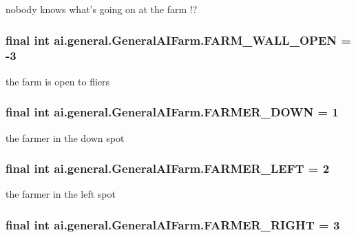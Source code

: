 \label{classai_1_1general_1_1_general_a_i_farm_aed2adecb0cce6a9a2fa0806c8fa11af5}
nobody knows what's going on at the farm !? \hypertarget{classai_1_1general_1_1_general_a_i_farm_a9235a0a0538a426043d785a00a3d4345}{
\subsubsection[{FARM\_\-WALL\_\-OPEN}]{\setlength{\rightskip}{0pt plus 5cm}final int {\bf ai.general.GeneralAIFarm.FARM\_\-WALL\_\-OPEN} = -\/3}}
\label{classai_1_1general_1_1_general_a_i_farm_a9235a0a0538a426043d785a00a3d4345}
the farm is open to fliers \hypertarget{classai_1_1general_1_1_general_a_i_farm_a8c4ee9d0755408d23fc4a2e3ce9a1dc1}{
\subsubsection[{FARMER\_\-DOWN}]{\setlength{\rightskip}{0pt plus 5cm}final int {\bf ai.general.GeneralAIFarm.FARMER\_\-DOWN} = 1}}
\label{classai_1_1general_1_1_general_a_i_farm_a8c4ee9d0755408d23fc4a2e3ce9a1dc1}
the farmer in the down spot \hypertarget{classai_1_1general_1_1_general_a_i_farm_af6c22fd003a4d97d93022ab3d1ceb2ea}{
\subsubsection[{FARMER\_\-LEFT}]{\setlength{\rightskip}{0pt plus 5cm}final int {\bf ai.general.GeneralAIFarm.FARMER\_\-LEFT} = 2}}
\label{classai_1_1general_1_1_general_a_i_farm_af6c22fd003a4d97d93022ab3d1ceb2ea}
the farmer in the left spot \hypertarget{classai_1_1general_1_1_general_a_i_farm_ad3a3956aee09fbbc3f1f471914ce9f9d}{
\subsubsection[{FARMER\_\-RIGHT}]{\setlength{\rightskip}{0pt plus 5cm}final int {\bf ai.general.GeneralAIFarm.FARMER\_\-RIGHT} = 3}}
